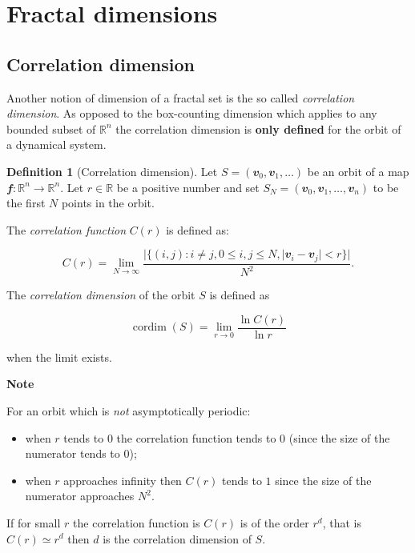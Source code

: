 \documentclass[
  a4paper,
  oneside,
  final]{krantz}
\providecommand{\tightlist}{%
  \setlength{\itemsep}{0pt}\setlength{\parskip}{0pt}}
\newcommand{\R}{\mathbb{R}}
\renewcommand{\v}[1]{{\mathbfit{#1}}}
\newcommand{\cdim}{\mathop{\mathrm{cordim}}}
\theoremstyle{definition}
\newtheorem{definition}{Definition}[chapter]
\theoremstyle{definition}
\theoremstyle{definition}
\theoremstyle{definition}
\theoremstyle{remark}
\begin{document}
\hypertarget{fractaldimcont}{%
\section{Fractal dimensions}\label{fractaldimcont}}

\hypertarget{correlationdim}{%
\subsection{Correlation dimension}\label{correlationdim}}

Another notion of dimension of a fractal set is the so called \emph{correlation dimension}. As opposed to the box-counting dimension which applies to any bounded subset of \(\R^{n}\) the correlation dimension is \textbf{only defined} for the orbit of a dynamical system.

\begin{definition}[Correlation dimension]
\protect\hypertarget{def:correlationdimension}{}\label{def:correlationdimension}Let \(S= (\v{v}_{0}, \v{v}_{1}, \ldots )\) be an orbit of a map \(\v{f}: \R^{n} \to \R^{n}\). Let \(r \in \R\) be a positive number and set \(S_{N} = (\v{v}_{0}, \v{v}_{1}, \ldots, \v{v}_{n})\) to be the first \(N\) points in the orbit.

The \emph{correlation function} \(C(r)\) is defined as:

\[ C(r) = \lim_{N \to \infty} \dfrac{|\{ (i,j) : i \ne j, 0 \le i,j \le N, |\v{v}_i - \v{v}_{j}| <r    \} |}{N^2}. \]

The \emph{correlation dimension} of the orbit \(S\) is defined as

\[ \cdim(S) = \lim_{r \to 0} \dfrac{\ln C(r)}{\ln r} \]

when the limit exists.
\end{definition}

\begin{palegreenbox}

\begin{center}
\textbf{Note}

\end{center}

For an orbit which is \emph{not} asymptotically periodic:

\begin{itemize}
\tightlist
\item
  when \(r\) tends to \(0\) the correlation function tends to \(0\) (since the size of the numerator tends to \(0\));
\item
  when \(r\) approaches infinity then \(C(r)\) tends to \(1\) since the size of the numerator approaches \(N^2.\)
\end{itemize}

If for small \(r\) the correlation function is \(C(r)\) is of the order \(r^{d}\), that is \(C(r) \simeq r^{d}\) then \(d\) is the correlation dimension of \(S\).

\end{palegreenbox}
\end{document}
